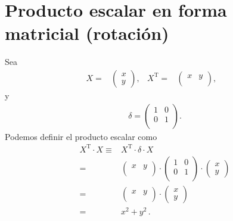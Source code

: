 \documentclass[11pt,a4paper]{book}
\begin{document}
\section{Producto escalar en forma matricial (rotación)}
Sea 
\begin{align*}
    X =& \begin{pmatrix}
        x\\  
        y
    \end{pmatrix},&
    X^{\operatorname{T}} =& 
    \begin{pmatrix}
        x&y\\
    \end{pmatrix},&
\end{align*}
y
\begin{align*}
    \delta = \begin{pmatrix}
        1 & 0\\
        0 & 1\\
    \end{pmatrix}.
\end{align*}
Podemos definir el producto escalar como
\begin{align*}
    X^{\operatorname{T}}\cdot X 
   \equiv & X^{\operatorname{T}}\cdot \delta \cdot X \\
   = &\begin{pmatrix}
        x&y\\
    \end{pmatrix}\cdot  \begin{pmatrix}
        1 & 0\\
        0 & 1\\
    \end{pmatrix} \cdot \begin{pmatrix}
        x\\  
        y
    \end{pmatrix} \\
   = &\begin{pmatrix}
        x&y\\
    \end{pmatrix}\cdot \begin{pmatrix}
        x\\  
        y
    \end{pmatrix} \\
= & x^2 +y ^2\,.
\end{align*}

\newpage
\end{document}
